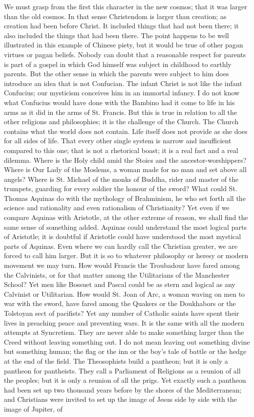 We must grasp from the first this character in the new cosmos; that it was larger than the old cosmos. In that sense Christendom is larger than creation; as creation had been before Christ. It included things that had not been there; it also included the things that had been there. The point happens to be well illustrated in this example of Chinese piety, but it would be true of other pagan virtues or pagan beliefs. Nobody can doubt that a reasonable respect for parents is part of a gospel in which God himself was subject in childhood to earthly parents. But the other sense in which the parents were subject to him does introduce an idea that is not Confucian. The infant Christ is not like the infant Confucius; our mysticism conceives him in an immortal infancy. I do not know what Confucius would have done with the Bambino had it come to life in his arms as it did in the arms of St. Francis. But this is true in relation to all the other religions and philosophies; it is the challenge of the Church. The Church contains what the world does not contain. Life itself does not provide as she does for all sides of life. That every other single system is narrow and insufficient compared to this one; that is not a rhetorical boast; it is a real fact and a real dilemma. Where is the Holy child amid the Stoics and the ancestor-worshippers? Where is Our Lady of the Moslems, a woman made for no man and set above all angels? Where is St. Michael of the monks of Buddha, rider and master of the trumpets, guarding for every soldier the honour of the sword? What could St. Thomas Aquinas do with the mythology of Brahminism, he who set forth all the science and rationality and even rationalism of Christianity? Yet even if we compare Aquinas with Aristotle, at the other extreme of reason, we shall find the same sense of something added. Aquinas could understand the most logical parts of Aristotle; it is doubtful if Aristotle could have understood the most mystical parts of Aquinas. Even where we can hardly call the Christian greater, we are forced to call him larger. But it is so to whatever philosophy or heresy or modern movement we may turn. How would Francis the Troubadour have fared among the Calvinists, or for that matter among the Utilitarians of the Manchester School? Yet men like Bossuet and Pascal could be as stern and logical as any Calvinist or Utilitarian. How would St. Joan of Arc, a woman waving on men to war with the sword, have fared among the Quakers or the Doukhabors or the Tolstoyan sect of pacifists? Yet any number of Catholic saints have spent their lives in preaching peace and preventing wars. It is the same with all the modern attempts at Syncretism. They are never able to make something larger than the Creed without leaving something out. I do not mean leaving out something divine but something human; the flag or the inn or the boy's tale of battle or the hedge at the end of the field. The Theosophists build a pantheon; but it is only a pantheon for pantheists. They call a Parliament of Religions as a reunion of all the peoples; but it is only a reunion of all the prigs. Yet exactly such a pantheon had been set up two thousand years before by the shores of the Mediterranean; and Christians were invited to set up the image of Jesus side by side with the image of Jupiter, of 